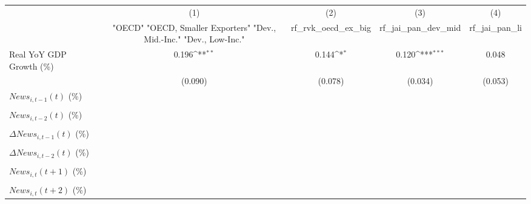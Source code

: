 {
\def\sym#1{\ifmmode^{#1}\else\(^{#1}\)\fi}
\begin{tabular}{l*{4}{c}}
\toprule
                    &\multicolumn{1}{c}{(1)}&\multicolumn{1}{c}{(2)}&\multicolumn{1}{c}{(3)}&\multicolumn{1}{c}{(4)}\\
                    &\multicolumn{1}{c}{ "OECD" "OECD, Smaller Exporters" "Dev., Mid.-Inc." "Dev., Low-Inc."}&\multicolumn{1}{c}{rf_rvk_oecd_ex_big}&\multicolumn{1}{c}{rf_jai_pan_dev_mid}&\multicolumn{1}{c}{rf_jai_pan_li}\\
\midrule
Real YoY GDP Growth (\%)&       0.196\sym{**} &       0.144\sym{*}  &       0.120\sym{***}&       0.048         \\
                    &     (0.090)         &     (0.078)         &     (0.034)         &     (0.053)         \\
\addlinespace
$ News_{i,t-1}(t)$ (\%)&                     &                     &                     &                     \\
                    &                     &                     &                     &                     \\
\addlinespace
$ News_{i,t-2}(t)$ (\%)&                     &                     &                     &                     \\
                    &                     &                     &                     &                     \\
\addlinespace
$ \Delta News_{i,t-1}(t)$ (\%)&                     &                     &                     &                     \\
                    &                     &                     &                     &                     \\
\addlinespace
$ \Delta News_{i,t-2}(t)$ (\%)&                     &                     &                     &                     \\
                    &                     &                     &                     &                     \\
\addlinespace
$ News_{i,t}(t+1)$ (\%)&                     &                     &                     &                     \\
                    &                     &                     &                     &                     \\
\addlinespace
$ News_{i,t}(t+2)$ (\%)&                     &                     &                     &                     \\

\end{tabular}}

